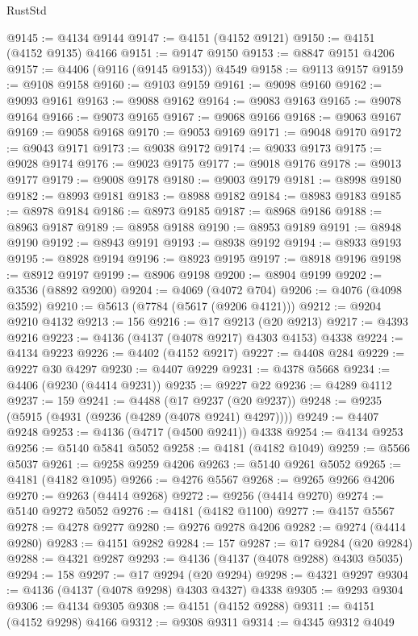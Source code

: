 \begin{lexlean}{RustStd}
\begin{coremodule}
{\begin{coremodule}
{{{{{{{{{{{{{{{{{{{{{{{{{{{{{{{{{{{{{{{{{{{{{{{{{{@9145 := @4134 @9144
@9147 := @4151 (@4152 @9121)
@9150 := @4151 (@4152 @9135) @4166
@9151 := @9147 @9150
@9153 := @8847 @9151 @4206
@9157 := @4406 (@9116 (@9145 @9153)) @4549
@9158 := @9113 @9157
@9159 := @9108 @9158
@9160 := @9103 @9159
@9161 := @9098 @9160
@9162 := @9093 @9161
@9163 := @9088 @9162
@9164 := @9083 @9163
@9165 := @9078 @9164
@9166 := @9073 @9165
@9167 := @9068 @9166
@9168 := @9063 @9167
@9169 := @9058 @9168
@9170 := @9053 @9169
@9171 := @9048 @9170
@9172 := @9043 @9171
@9173 := @9038 @9172
@9174 := @9033 @9173
@9175 := @9028 @9174
@9176 := @9023 @9175
@9177 := @9018 @9176
@9178 := @9013 @9177
@9179 := @9008 @9178
@9180 := @9003 @9179
@9181 := @8998 @9180
@9182 := @8993 @9181
@9183 := @8988 @9182
@9184 := @8983 @9183
@9185 := @8978 @9184
@9186 := @8973 @9185
@9187 := @8968 @9186
@9188 := @8963 @9187
@9189 := @8958 @9188
@9190 := @8953 @9189
@9191 := @8948 @9190
@9192 := @8943 @9191
@9193 := @8938 @9192
@9194 := @8933 @9193
@9195 := @8928 @9194
@9196 := @8923 @9195
@9197 := @8918 @9196
@9198 := @8912 @9197
@9199 := @8906 @9198
@9200 := @8904 @9199
@9202 := @3536 (@8892 @9200)
@9204 := @4069 (@4072 @704)
@9206 := @4076 (@4098 @3592)
@9210 := @5613 (@7784 (@5617 (@9206 @4121)))
@9212 := @9204 @9210 @4132
@9213 := 156
@9216 := @17 @9213 (@20 @9213)
@9217 := @4393 @9216
@9223 := @4136 (@4137 (@4078 @9217) @4303 @4153) @4338
@9224 := @4134 @9223
@9226 := @4402 (@4152 @9217)
@9227 := @4408 @284
@9229 := @9227 @30 @4297
@9230 := @4407 @9229
@9231 := @4378 @5668
@9234 := @4406 (@9230 (@4414 @9231))
@9235 := @9227 @22
@9236 := @4289 @4112
@9237 := 159
@9241 := @4488 (@17 @9237 (@20 @9237))
@9248 := @9235 (@5915 (@4931 (@9236 (@4289 (@4078 @9241) @4297))))
@9249 := @4407 @9248
@9253 := @4136 (@4717 (@4500 @9241)) @4338
@9254 := @4134 @9253
@9256 := @5140 @5841 @5052
@9258 := @4181 (@4182 @1049)
@9259 := @5566 @5037
@9261 := @9258 @9259 @4206
@9263 := @5140 @9261 @5052
@9265 := @4181 (@4182 @1095)
@9266 := @4276 @5567
@9268 := @9265 @9266 @4206
@9270 := @9263 (@4414 @9268)
@9272 := @9256 (@4414 @9270)
@9274 := @5140 @9272 @5052
@9276 := @4181 (@4182 @1100)
@9277 := @4157 @5567
@9278 := @4278 @9277
@9280 := @9276 @9278 @4206
@9282 := @9274 (@4414 @9280)
@9283 := @4151 @9282
@9284 := 157
@9287 := @17 @9284 (@20 @9284)
@9288 := @4321 @9287
@9293 := @4136 (@4137 (@4078 @9288) @4303 @5035)
@9294 := 158
@9297 := @17 @9294 (@20 @9294)
@9298 := @4321 @9297
@9304 := @4136 (@4137 (@4078 @9298) @4303 @4327) @4338
@9305 := @9293 @9304
@9306 := @4134 @9305
@9308 := @4151 (@4152 @9288)
@9311 := @4151 (@4152 @9298) @4166
@9312 := @9308 @9311
@9314 := @4345 @9312 @4049
}}}}}}}}}}}}}}}}}}}}}}}}}}}}}}}}}}}}}}}}}}}}}}}}}}
\end{coremodule}}
\end{coremodule}
\end{lexlean}
